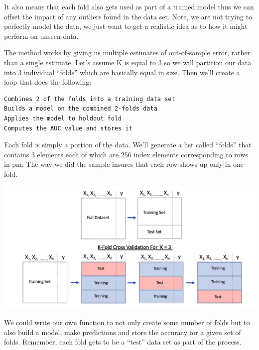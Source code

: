 \documentclass[
]{article}
\begin{document}
It also means that each fold also gets used as part of a trained model
thus we can offset the impact of any outliers found in the data set.
Note, we are not trying to perfectly model the data, we just want to get
a realistic idea as to how it might perform on unseen data.

The method works by giving us multiple estimates of out-of-sample error,
rather than a single estimate. Let's assume K is equal to 3 so we will
partition our data into 3 individual ``folds'' which are basically equal
in size. Then we'll create a loop that does the following:

\begin{verbatim}
Combines 2 of the folds into a training data set
Builds a model on the combined 2-folds data
Applies the model to holdout fold
Computes the AUC value and stores it
\end{verbatim}

Each fold is simply a portion of the data. We'll generate a list called
``folds'' that contains 3 elements each of which are 256 index elements
corresponding to rows in pm. The way we did the sample insures that each
row shows up only in one fold.

\includegraphics[width=1.2\textwidth,height=\textheight]{./IMG/crossfold.png}

We could write our own function to not only create some number of folds
but to also build a model, make predictions and store the accuracy for a
given set of folds. Remember, each fold gets to be a ``test'' data set
as part of the process.
\end{document}
